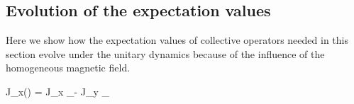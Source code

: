 \subsection{Evolution of the expectation values}
Here we show how the expectation values of collective operators needed in this section evolve under the unitary dynamics because of the influence of the homogeneous magnetic field.

\be
  \tr J_x(\Theta) = J_x _\Theta - J_y _{\Theta}
\ee
